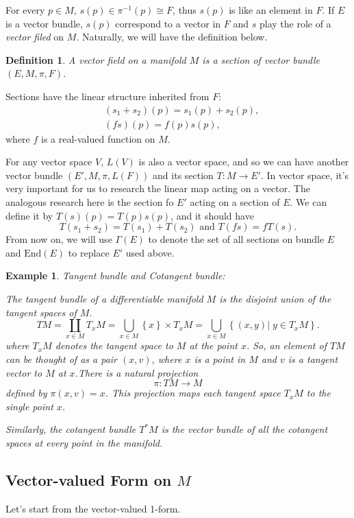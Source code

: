 \documentclass[11pt]{article}
\theoremstyle{plain}%
\newtheorem{defi}{Definition}[section]%
\newtheorem{exa}{Example}[section]%
\begin{document}
For every $p\in M$, $s(p)\in \pi^{-1}(p) \cong F$, thus $s(p)$ is like an element in $F$. If $E$ is a vector bundle, $s(p)$ correspond to a vector in $F$ and $s$ play the role of a \textit{vector filed} on $M$. Naturally, we will have the definition below.
\begin{defi}
	A vector field on a manifold $M$ is a section of vector bundle $(E,M,\pi,F)$.
\end{defi}
Sections have the linear structure inherited from $F$:
\[
	\begin{split}
		&(s_1+s_2)(p)=s_1(p)+s_2(p),\\
		&(fs)(p)=f(p)s(p),
	\end{split}
\]
where $f$ is a real-valued function on $M$.

For any vector space $V$, $L(V)$ is also a vector space, and so we can have another vector bundle $(E',M,\pi,L(F))$ and its section $T:M\rightarrow E'$. In vector space, it's very important for us to research the linear map acting on a vector. The analogous research here is the section fo $E'$ acting on a section of $E$. We can define it by $T(s)(p)=T(p)s(p)$, and it should have
\[
	T(s_1+s_2)=T(s_1)+T(s_2) \text{\ and\ } T(fs)=fT(s).
\]
From now on, we will use $\Gamma(E)$ to denote the set of all sections on bundle $E$ and $\mathrm{End}(E)$ to replace $E'$ used above.
\begin{exa}
	Tangent bundle and Cotangent bundle:

	The tangent bundle of a differentiable manifold $M$ is the disjoint union of the tangent spaces of $M$.
	\[
		TM =\coprod_{x\in M}T_xM=\bigcup_{x\in M} \left\{x\right\}\times T_xM
		=\bigcup_{x\in M} \left\{(x, y)\vert\; y\in T_xM\right\}.
	\]
	where $T_xM$ denotes the tangent space to $M$ at the point $x$. So, an element of $TM$ can be thought of as a pair $(x, v)$, where $x$ is a point in $M$ and $v$ is a tangent vector to $M$ at $x$.There is a natural projection 
	\[
		\pi : TM \rightarrow M 
	\]
	defined by $\pi(x, v) = x$. This projection maps each tangent space $T_xM$ to the single point $x$.

	Similarly, the cotangent bundle $T^*\!M$ is the vector bundle of all the cotangent spaces at every point in the manifold.
\end{exa}
\subsection{Vector-valued Form on $M$}
Let's start from the vector-valued 1-form. 
\end{document}
